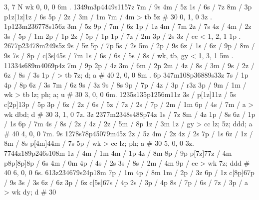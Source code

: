3, 7
N
wk
0, 0, 0
6m . 
1349m3p4449s1157z 
7m / 9s 
4m / 5z 
1s / 
6s / 7z 
8m / 3p 
p1z[1z]1z / 6s 
5p / 
2z / 
3m / 1m 
7m / 4m 
> tb
5z # 30
%
0, 1, 0
3z .
1p123m236778s156z 
3m / 5z 
9p / 
7m / 6z 
1p / 1z 
4m / 7m 
2z / 7s 
4z / 
4m / 2z 
3s / 
5p / 1m 
2p / 1p 
2z / 
5p / 1p 
1p /
7z / 2m 
3p / 2s 
3z / 
cc < 
% 
1, 2, 1 
1p .
2677p23478m249s5z 
9s / 5z  
5p / 7p 
5s / 2s 
5m / 
2p / 9s 
6z / 
1s / 
6z / 
9p / 
8m / 9s 
7s / 
8p / 
c[3s]45s / 7m 
1s / 
6s / 
6s / 
5s / 
8s / 
wk, tb, gy < 
%
1, 3, 1
5m . 
11334s689m4069p4z 
7m / 9p 
2p / 4z
3m / 
6m / 2p 
2m / 
4z / 
8s / 
3m / 
9s / 
2z / 
6z / 
8s / 3s 
1p / 
> tb 
7z; d; a # 40
%
2, 0, 0
8m . 6p
347m108p36889s33z 
7s / 1p 
4p / 8p 
6z / 3s 
7m / 6z 
9s / 3z 
9s / 8s 
9p / 
7p / 
4z / 
3p / r3z 
3p / 
9m / 
1m / 
wk > tb 
lz; ph; a; u # 30 
% 
3, 0, 0
6m. 
1235s135p1256m11z 
3s / 
p[1z]11z / 5s
c[2p]13p / 5p 
3p / 
6z /
2z / 
6s / 
5z / 
7z / 
2s / 
7p / 
2m / 1m 
6p /
4s / 
7m / a 
> wk 
dbd; d # 30
%
3, 1, 0
7z. 3z
2377m2348s488p74z 
1s / 7z 
8m / 4z 
1p / 8s 
6z / 
1p / 1s 
6p / 7m 
4s / 
8s / 
2z / 
4z / 
2z / 
5m / 8p 
1z / 3m 
1z / 
gy > cc 
lz; 5z; ddd; a # 40
%
4, 0, 0
7m. 9s
1278s78p45079m45z 
2z / 5z 
4m / 2z 
4z / 2s 
7p / 1s 
6z / 
1z / 
8m / 8s 
p[4m]44m / 7s 
5p / 
wk > cc 
lz; ph; a # 30
%
5, 0, 0 
3z.
7744z189p246s108m 
1z / 
4m / 1m 
4m / 1p 
4z / 8m 
8p / 9p 
p[7z]77z / 4m 
p8p[8p]8p / 6s 
4m / 0m 
4p / 
4s / 2s 
3s / 
8s / 
2m / 4m 
9p / 
cc > wk 
7z; ddd # 40
%
6, 0, 0
6s. 
613z234679s24p18m 
7p / 1m 
4p / 8m 
1m / 
2p / 3z 
6p / 1z 
c[8p]67p / 9s 
3s / 3s 
6z / 6z 
3p / 6z 
c[5s]67s / 4p 
2s / 
3p / 4p 
8s / 
7p / 
6s / 
7z / 
3p / a 
> wk 
dy; d # 30